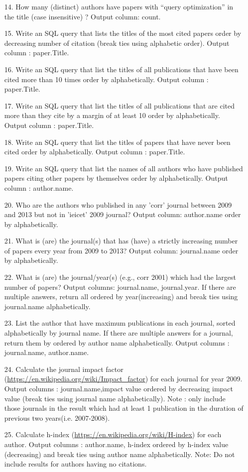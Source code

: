 \documentclass[10pt]{article}
\begin{document}
\begin{enumerate}
\item
[14.] How many (distinct) authors have papers with “query optimization” in the title (case insensitive) ? Output column: count.
\item
[15.] Write an SQL query that lists the titles of the most cited papers order by decreasing number of citation (break ties using alphabetic order). Output column : paper.Title.
\item
[16.] Write an SQL query that  list the titles of all publications that have been cited more than 10 times order by alphabetically. Output column : paper.Title.
\item
[17.] Write an SQL query that list the titles of all publications that are cited more than they cite by a margin of at least 10 order by alphabetically. Output column : paper.Title.
\item
[18.] Write an SQL query that list the titles of papers that have never been cited order by alphabetically. Output column : paper.Title.
\item
[19.] Write an SQL query that list the names of all authors who have published papers citing other papers by themselves order by alphabetically. Output column : author.name.
\item
[20.] Who are the authors who published in any 'corr' journal between 2009 and 2013 but not in 'ieicet' 2009 journal? Output column: author.name order by alphabetically.
\item
[21.] What is (are) the journal(s) that has (have) a strictly increasing number of papers every year from 2009 to 2013? Output column: journal.name order by alphabetically.
\item
[22.] What is (are) the journal/year(s) (e.g., corr 2001) which had the largest number of papers? Output columns: journal.name, journal.year. If there are multiple answers, return all ordered by year(increasing) and break ties using journal.name alphabetically.
\item
[23.] List the author that have maximum publications in each journal, sorted alphabetically by journal name. If there are multiple answers for a journal, return them by ordered by author name alphabetically. Output columns : journal.name, author.name.
\item
[24.] Calculate the journal impact factor (\url{https://en.wikipedia.org/wiki/Impact_factor}) for each journal for year 2009. Output columns : journal.name,impact value ordered by decreasing impact value (break ties using journal name alphabetically). Note : only include those journals in the result which had at least 1 publication in the duration of previous two years(i.e. 2007-2008).
\item
[25.] Calculate h-index (\url{https://en.wikipedia.org/wiki/H-index}) for each author. Output columns : author.name, h-index ordered by h-index value (decreasing) and break ties using author name alphabetically. Note: Do not include results for authors having no citations.

\end{enumerate}
\end{document}
